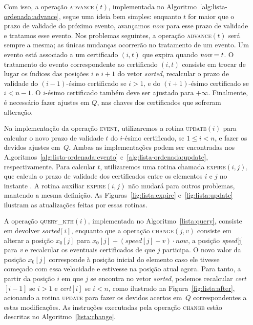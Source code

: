 Com isso, a operação \textsc{advance}$(t)$, implementada no
Algoritmo~\ref{alg:lista-ordenada:advance}, segue uma ideia bem simples: enquanto
$t$ for maior que o prazo de validade do próximo evento, avançamos
\textit{now} para esse prazo de validade e tratamos esse evento.
Nos problemas seguintes, a operação \textsc{advance}$(t)$ será sempre a
mesma;
as únicas mudanças ocorrerão no tratamento de um evento.
Um evento está associado a um certificado $(i, t)$ que expira quando
$\textit{now} = t$.
O tratamento do evento correspondente ao certificado $(i, t)$ consiste em trocar de lugar os
índices das posições $i$ e $i + 1$ do vetor \textit{sorted}, recalcular o prazo de validade do
$(i-1)$-ésimo certificado se $i > 1$, e do $(i + 1)$-ésimo
certificado se $i < n - 1$.
O $i$-ésimo certificado também deve ser ajustado para $+\infty$.
Finalmente, é necessário fazer ajustes em $Q$, nas chaves dos certificados que sofreram
alteração.



Na implementação da operação \textsc{event}, utilizaremos a rotina
\textsc{update}$(i)$ para calcular o novo prazo de validade $t$ do
$i$-ésimo certificado, se $1 \leq i < n$, e fazer os devidos ajustes
em~$Q$.
Ambas as implementações podem ser encontradas nos Algoritmos~\ref{alg:lista-ordenada:evento}
e~\ref{alg:lista-ordenada:update}, respectivamente.
Para calcular $t$, utilizaremos uma rotina chamada \textsc{expire}$(i,
j)$, que calcula o prazo de validade dos certificados entre os
elementos $i$ e $j$ no instante \now.
A rotina auxiliar \textsc{expire}$(i, j)$ não mudará para outros problemas, mantendo a
mesma definição.
As Figuras~\ref{fig:lista:expire} e~\ref{fig:lista:update} ilustram as atualizações feitas por
essas rotinas.









A operação \textsc{query\_kth}$(i)$, implementada no Algoritmo~\ref{lista:query}, consiste em
devolver \textit{sorted}$[i]$, enquanto que a operação \textsc{change}$(j, v)$ consiste em alterar
a posição $x_0[j]$ para $x_0[j] + (\mathit{speed}[j] - v)\cdot now$,
a posição \textit{speed}[j] para \textit{v} e recalcular os
eventuais certificados de que $j$ participa.
O novo valor da posição $x_0[j]$ corresponde à posição inicial do elemento caso ele tivesse
começado com essa velocidade e estivesse na posição atual agora.
Para tanto, a partir da posição $i$ em que $j$ se encontra no vetor
\textit{sorted}, podemos recalcular \textit{cert}$[i - 1]$ se $i >
1$ e \textit{cert}$[i]$ se $i < n$, como ilustrado na Figura~\ref{fig:lista:after}, acionando a
rotina \textsc{update} para fazer
os devidos acertos em~$Q$ correspondentes a estas modificações.
As instruções executadas pela operação \textsc{change} estão descritas
no Algoritmo~\ref{lista:change}.

